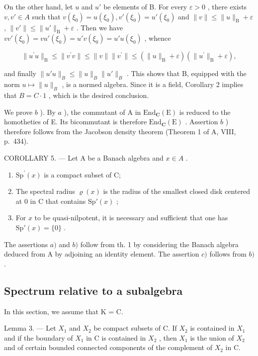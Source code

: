 On the other hand, let \(u\) and \(u'\) be elements of B. For every \(\varepsilon > 0\) , there exists \(v, v' \in A\) such that \(v(\xi_0) = u(\xi_0), v'(\xi_0) = u'(\xi_0)\) and \(\|v\| \leqslant \|u\|_{\mathrm{B}} + \varepsilon\) , \(\|v'\| \leqslant \|u'\|_{\mathrm{B}} + \varepsilon\) . Then we have \(vv'(\xi_0) = vu'(\xi_0) = u'v(\xi_0) = u'u(\xi_0)\) , whence

\[
\| u ^ {\prime} u \| _ {\mathrm{B}} \leqslant \| v ^ {\prime} v \| \leqslant \| v \| \| v ^ {\prime} \| \leqslant (\| u \| _ {\mathrm{B}} + \varepsilon) (\| u ^ {\prime} \| _ {\mathrm{B}} + \varepsilon),
\]

and finally \(\|u'u\|_{B} \leqslant \|u\|_{B} \|u'\|_{B}\) . This shows that B, equipped with the norm \(u \mapsto \|u\|_{B}\) , is a normed algebra. Since it is a field, Corollary 2 implies that \(B = C \cdot 1\) , which is the desired conclusion.

We prove \(b\) ). By \(a\) ), the commutant of A in \(\mathrm{End}_{\mathbf{C}}(\mathrm{E})\) is reduced to the homotheties of E. Its bicommutant is therefore \(\mathrm{End}_{\mathbf{C}}(\mathrm{E})\) . Assertion \(b\) ) therefore follows from the Jacobson density theorem (Theorem 1 of A, VIII, p.~434).

COROLLARY 5. --- Let A be a Banach algebra and \(x \in A\) .

\begin{enumerate}
\def\labelenumi{\alph{enumi})}
\item
  \(\mathrm{Sp}^{\prime}(x)\) is a compact subset of C;
\item
  The spectral radius \(\varrho(x)\) is the radius of the smallest closed disk centered at 0 in C that contains \(\mathrm{Sp}'(x)\) ;
\item
  For \(x\) to be quasi-nilpotent, it is necessary and sufficient that one has \(\mathrm{Sp}'(x) = \{0\}\) .
\end{enumerate}

The assertions \(a)\) and \(b)\) follow from th. 1 by considering the Banach algebra deduced from A by adjoining an identity element. The assertion \(c)\) follows from \(b)\) .

\subsection{Spectrum relative to a subalgebra}

In this section, we assume that K = C.

Lemma 3. --- Let \(X_{1}\) and \(X_{2}\) be compact subsets of C. If \(X_{2}\) is contained in \(X_{1}\) and if the boundary of \(X_{1}\) in C is contained in \(X_{2}\) , then \(X_{1}\) is the union of \(X_{2}\) and of certain bounded connected components of the complement of \(X_{2}\) in C.

